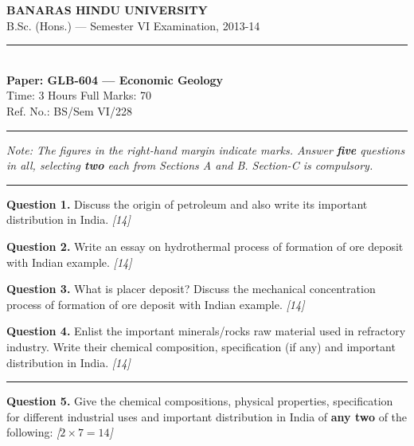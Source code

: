\documentclass[11pt,a4paper]{article}
\newcommand{\pts}[1]{\hfill   \textit{[#1]}}
\begin{document}
\begin{center}
  {\large\bfseries BANARAS HINDU UNIVERSITY}\\[2pt]
  {\normalsize B.Sc. (Hons.) --- Semester VI Examination, 2013-14}\\[6pt]
  \rule{0.8\linewidth}{0.5pt}\\[6pt]
  {\large\bfseries Paper: GLB-604 --- Economic Geology}\\[4pt]
  {\normalsize Time: 3 Hours \hfill Full Marks: 70}\\[2pt]
  {\small Ref. No.: BS/Sem VI/228}
\end{center}
\rule{\linewidth}{0.4pt}
\smallskip



\noindent   \textit{Note: The figures in the right-hand margin indicate marks. Answer   \textbf{five} questions in all, selecting   \textbf{two} each from Sections A and B. Section-C is compulsory.}
\bigskip

\bigskip


\rule{\linewidth}{0.4pt}\smallskip




\noindent   \textbf{Question 1.} Discuss the origin of petroleum and also write its important distribution in India. \pts{14}

\medskip


\noindent   \textbf{Question 2.} Write an essay on hydrothermal process of formation of ore deposit with Indian example. \pts{14}

\medskip


\noindent   \textbf{Question 3.} What is placer deposit? Discuss the mechanical concentration process of formation of ore deposit with Indian example. \pts{14}

\medskip


\noindent   \textbf{Question 4.} Enlist the important minerals/rocks raw material used in refractory industry. Write their chemical composition, specification (if any) and important distribution in India. \pts{14}

\bigskip


\rule{\linewidth}{0.4pt}\smallskip




\noindent   \textbf{Question 5.} Give the chemical compositions, physical properties, specification for different industrial uses and important distribution in India of   \textbf{any two} of the following: \pts{$2  \times 7 = 14$}
\end{document}
